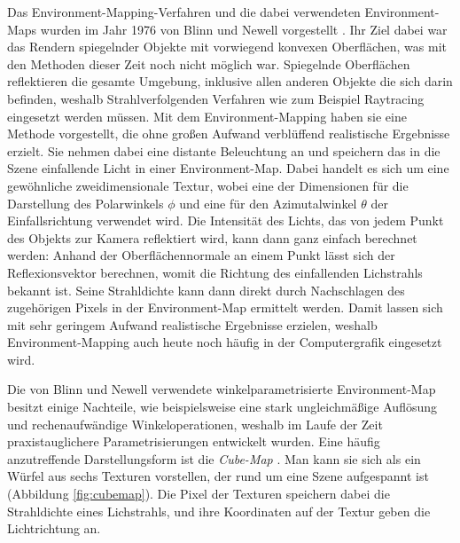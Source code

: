    Das Environment-Mapping-Verfahren und die dabei verwendeten Environment-Maps wurden im Jahr 1976 von Blinn und Newell vorgestellt \cite{Blinn_1976}.
   Ihr Ziel dabei war das Rendern spiegelnder Objekte mit vorwiegend konvexen Oberflächen, was mit den Methoden dieser Zeit noch nicht möglich war.
    Spiegelnde Oberflächen reflektieren die gesamte Umgebung, inklusive allen anderen Objekte die sich darin befinden, weshalb Strahlverfolgenden Verfahren wie zum Beispiel Raytracing eingesetzt werden müssen. 
   Mit dem Environment-Mapping haben sie eine Methode vorgestellt, die ohne großen Aufwand verblüffend realistische Ergebnisse erzielt. 
   Sie nehmen dabei eine distante Beleuchtung an und speichern das in die Szene einfallende Licht in einer Environment-Map.
   Dabei handelt es sich um eine gewöhnliche zweidimensionale Textur, wobei eine der Dimensionen für die Darstellung des Polarwinkels $\phi$  und eine für den Azimutalwinkel $\theta$ der Einfallsrichtung verwendet wird.
   Die Intensität des Lichts, das von jedem Punkt des Objekts zur Kamera reflektiert wird, kann dann ganz einfach berechnet werden: 
   Anhand der Oberflächennormale an einem Punkt lässt sich der Reflexionsvektor berechnen, womit die Richtung des einfallenden Lichstrahls bekannt ist. 
   Seine Strahldichte kann dann direkt durch Nachschlagen des zugehörigen Pixels in der Environment-Map ermittelt werden.
   Damit lassen sich mit sehr geringem Aufwand realistische Ergebnisse erzielen, weshalb Environment-Mapping auch heute noch häufig in der Computergrafik eingesetzt wird. 
   
   Die von Blinn und Newell verwendete winkelparametrisierte Environment-Map besitzt einige Nachteile, wie beispielsweise eine stark ungleichmäßige Auflösung und rechenaufwändige Winkeloperationen, weshalb im Laufe der Zeit praxistauglichere Parametrisierungen entwickelt wurden.
   Eine häufig anzutreffende Darstellungsform ist die \emph{Cube-Map} \cite{Akenine_2011}. 
   Man kann sie sich als ein Würfel aus sechs Texturen vorstellen, der rund um eine Szene aufgespannt ist (Abbildung \ref{fig:cubemap}). 
   Die Pixel der Texturen speichern dabei die Strahldichte eines Lichstrahls, und ihre Koordinaten auf der Textur geben die Lichtrichtung an.
   
